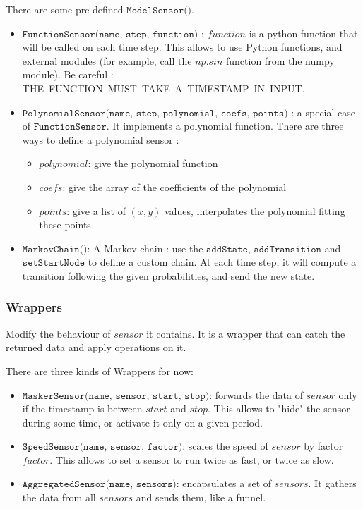 There are some pre-defined $\texttt{ModelSensor()}$.

\begin{itemize}
    \item $\texttt{FunctionSensor(name, step, function)}$ : $function$ is a
python function that will be called on each time step. This allows to use Python
functions, and external modules (for example, call the $np.sin$ function from
the numpy module). Be careful : THE FUNCTION MUST TAKE A TIMESTAMP IN INPUT.

    \item $\texttt{PolynomialSensor(name, step, polynomial, coefs, points)}$ : a
special case of $\texttt{FunctionSensor}$. It implements a polynomial function.
There are three ways to define a polynomial sensor :
    \begin{itemize}
        \item $polynomial$: give the polynomial function
        \item $coefs$: give the array of the coefficients of the polynomial
        \item $points$: give a list of $(x, y)$ values, interpolates the
        polynomial fitting these points
    \end{itemize}
    \item $\texttt{MarkovChain()}$: A Markov chain : use the $\texttt{addState}$,
    $\texttt{addTransition}$ and $\texttt{setStartNode}$ to define a custom chain.
    At each time step, it will compute a transition following the given
    probabilities, and send the new state.
\end{itemize}

\subsubsection{Wrappers}
Modify the behaviour of $sensor$ it contains. It is a wrapper that can catch the
returned data and apply operations on it.

There are three kinds of Wrappers for now:
\begin{itemize}
    \item $\texttt{MaskerSensor(name, sensor, start, stop)}$: forwards the data
of $sensor$ only if the timestamp is between $start$ and $stop$. This allows to
"hide" the sensor during some time, or activate it only on a given period.
    \item $\texttt{SpeedSensor(name, sensor, factor)}$: scales the speed of
$sensor$ by factor $factor$. This allows to set a sensor to run twice as fast,
or twice as slow.
    \item $\texttt{AggregatedSensor(name, sensors)}$: encapsulates a set of
$sensors$. It gathers the data from all $sensors$ and sends them, like a funnel.
\end{itemize}

